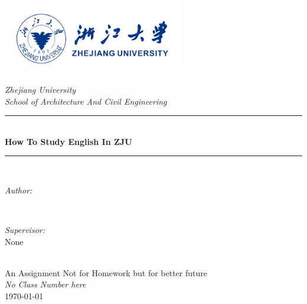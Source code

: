 \documentclass[10pt]{article}
\author{Kailian Jacy}
\begin{document}
 
\begin{titlepage}
	\newcommand{\HRule}{\rule{\linewidth}{0.5mm}}
	\includegraphics[width=8cm]{fig/zjulogo.png}\\[1cm] 
	\center 
	\quad\\[1.5cm]
	\textsl{\Large Zhejiang University }\\[0.5cm] 
	\textsl{\large School of Architecture And Civil Engineering}\\[0.5cm] 
	\makeatletter
	\HRule \\[0.4cm]
	{ \huge \bfseries How To Study English In ZJU}\\[0.4cm] 
	\HRule \\[1.5cm]
	\begin{minipage}{0.4\textwidth}
		\begin{flushleft} \large
			\emph{Author:}\\
			\@author 
		\end{flushleft}
	\end{minipage}
	~
	\begin{minipage}{0.4\textwidth}
		\begin{flushright} \large
			\emph{Supervisor:} \\
			\textup{None}
		\end{flushright}
	\end{minipage}\\[3cm]
	\makeatother
	{\large An Assignment Not for Homework but for better future}\\[0.5cm]
	{\large \emph{No Class Number here}}\\[0.5cm]
	{\large \today}\\[2cm] 
	\vfill 
\end{titlepage}

 
\setlength{\parindent}{2em}
 
\maketitle
 
\end{document}

